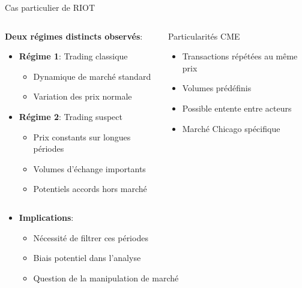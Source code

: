 \documentclass[aspectratio=169]{beamer}  %
\begin{document}
\begin{frame}{Cas particulier de RIOT}
    \begin{columns}
        \begin{column}{0.6\textwidth}
            \textbf{Deux régimes distincts observés}:
            \begin{itemize}
                \item \textbf{Régime 1}: Trading classique
                \begin{itemize}
                    \item Dynamique de marché standard
                    \item Variation des prix normale
                \end{itemize}
                \item \textbf{Régime 2}: Trading suspect
                \begin{itemize}
                    \item Prix constants sur longues périodes
                    \item Volumes d'échange importants
                    \item Potentiels accords hors marché
                \end{itemize}
            \end{itemize}
        \end{column}
        \begin{column}{0.4\textwidth}
            \begin{alertblock}{Particularités CME}
                \begin{itemize}
                    \item Transactions répétées au même prix
                    \item Volumes prédéfinis
                    \item Possible entente entre acteurs
                    \item Marché Chicago spécifique
                \end{itemize}
            \end{alertblock}
        \end{column}
    \end{columns}
    \vspace{0.2cm}
    \begin{itemize}
        \item \textbf{Implications}:
        \begin{itemize}
            \item Nécessité de filtrer ces périodes
            \item Biais potentiel dans l'analyse
            \item Question de la manipulation de marché
        \end{itemize}
    \end{itemize}
\end{frame}
\end{document}
